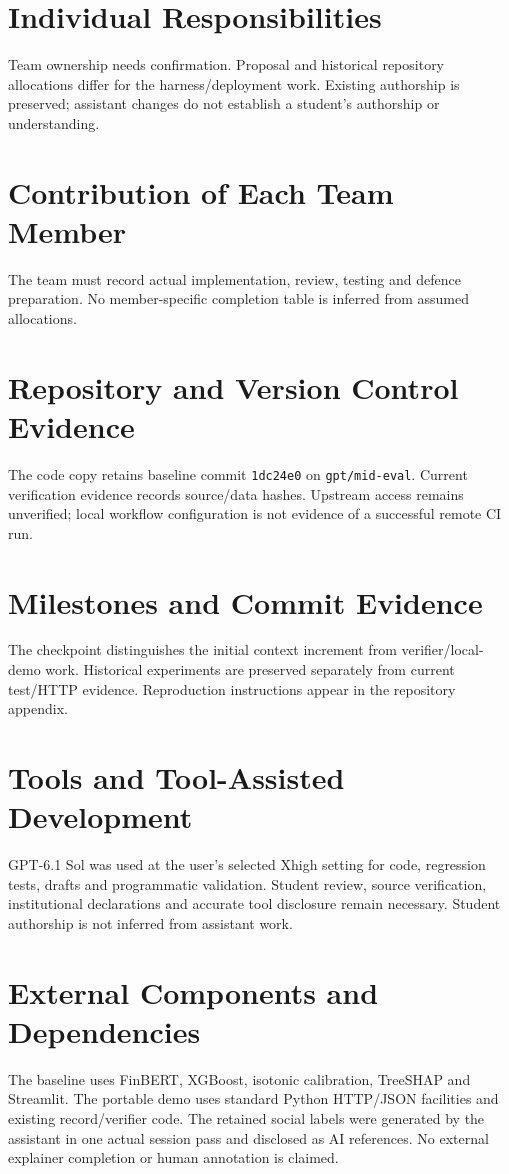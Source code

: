 \section{Individual Responsibilities}
Team ownership needs confirmation. Proposal and historical repository allocations differ for the harness/deployment work. Existing authorship is preserved; assistant changes do not establish a student's authorship or understanding.
\section{Contribution of Each Team Member}
The team must record actual implementation, review, testing and defence preparation. No member-specific completion table is inferred from assumed allocations.
\section{Repository and Version Control Evidence}
The code copy retains baseline commit \texttt{1dc24e0} on \texttt{gpt/mid-eval}. Current verification evidence records source/data hashes. Upstream access remains unverified; local workflow configuration is not evidence of a successful remote CI run.
\section{Milestones and Commit Evidence}
The checkpoint distinguishes the initial context increment from verifier/local-demo work. Historical experiments are preserved separately from current test/HTTP evidence. Reproduction instructions appear in the repository appendix.
\section{Tools and Tool-Assisted Development}
GPT-6.1 Sol was used at the user's selected Xhigh setting for code, regression tests, drafts and programmatic validation. Student review, source verification, institutional declarations and accurate tool disclosure remain necessary. Student authorship is not inferred from assistant work.
\section{External Components and Dependencies}
The baseline uses FinBERT, XGBoost, isotonic calibration, TreeSHAP and Streamlit. The portable demo uses standard Python HTTP/JSON facilities and existing record/verifier code. The retained social labels were generated by the assistant in one actual session pass and disclosed as AI references. No external explainer completion or human annotation is claimed.
